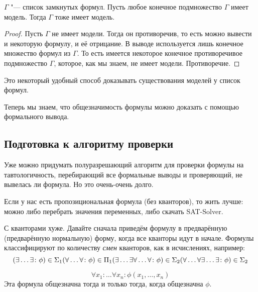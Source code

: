 \begin{theorem}
	$\Gamma$ "--- список замкнутых формул.
	Пусть любое конечное подмножество $\Gamma$ имеет модель.
	Тогда $\Gamma$ тоже имеет модель.
\end{theorem}
\begin{proof}
	Пусть $\Gamma$ не имеет модели.
	Тогда он противоречив, то есть можно вывести и некоторую формулу, и её отрицание.
	В выводе используется лишь конечное множество формул из $\Gamma$.
	То есть имеется некоторое конечное противоречивое подмножество $\Gamma$,
	которое, как мы знаем, не имеет модели.
	Противоречие.
\end{proof}
\begin{Rem}
	Это некоторый удобный способ доказывать существования моделей у список формул.
\end{Rem}

\begin{Rem}
	Теперь мы знаем, что общезначимость формулы можно доказать с помощью формального вывода.
\end{Rem}

\subsection{Подготовка к алгоритму проверки}
Уже можно придумать полуразрешающий алгоритм для проверки формулы на тавтологичность,
перебирающий все формальные выводы и проверяющий, не вывелась ли формула.
Но это очень-очень долго.

Если у нас есть пропозициональная формула (без кванторов), то жить лучше: можно либо перебрать
значения переменных, либо скачать SAT-Solver.

С кванторами хуже.
Давайте сначала приведём формулу в предварённую (предварённую нормальную) форму, когда
все кванторы идут в начале.
Формулы классифицируют по количеству \textsl{смен} кванторов, как в исчислениях, например:
\[
	(\exists \dots \exists \colon \phi) \in \Sigma_1 \\
	(\forall \dots \forall \colon \phi) \in \Pi_1 \\
	(\exists \dots \exists \forall \dots \forall \colon \phi) \in \Sigma_2 \\
	(\forall \dots \forall \exists \dots \exists \colon \phi) \in \Sigma_2 \\
\]

\begin{assertion}
	\[
		\forall x_1 \colon \dots \forall x_n \colon \phi(x_1, \dots, x_n)
	\]
	Эта формула общезначна тогда и только тогда, когда общезначна $\phi$.
\end{assertion}

